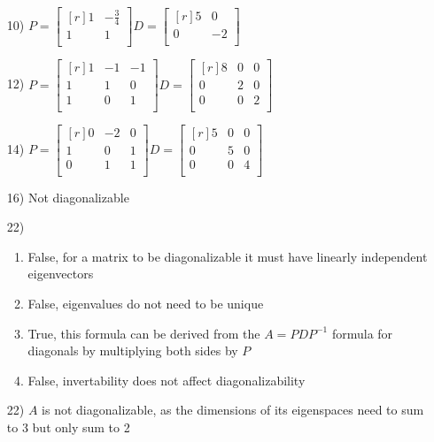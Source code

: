 \documentclass{article}
\begin{document}
\begin{enumerate}
  \item[10)]
    $P = \begin{bmatrix*}[r]
      1 & -\frac{3}{4} \\
      1 & 1 \\
    \end{bmatrix*} 
    D = \begin{bmatrix*}[r]
      5 & 0 \\
      0 & -2 \\
    \end{bmatrix*}$ 
  \item[12)]
    $P = \begin{bmatrix*}[r]
      1 & -1 & -1 \\ 
      1 & 1 & 0 \\ 
      1 & 0 & 1 \\
    \end{bmatrix*}
    D = \begin{bmatrix*}[r]
      8 & 0 & 0 \\
      0 & 2 & 0 \\
      0 & 0 & 2 \\
    \end{bmatrix*}$

  \item[14)]
    $P = \begin{bmatrix*}[r]
      0 & -2 & 0 \\
      1 & 0 & 1 \\
      0 & 1 & 1 \\
    \end{bmatrix*}
    D = \begin{bmatrix*}[r]
      5 & 0 & 0 \\
      0 & 5 & 0 \\
      0 & 0 & 4 \\
    \end{bmatrix*}$

  \item[16)]
    Not diagonalizable
  
  \item[22)]
    \begin{enumerate}
    \item
      False, for a matrix to be diagonalizable it must have 
      linearly independent eigenvectors
    \item 
      False, eigenvalues do not need to be unique

    \item
      True, this formula can be derived from the 
      $A = PDP^{-1}$ formula for diagonals by multiplying both
      sides by $P$
    \item 
      False, invertability does not affect diagonalizability
    \end{enumerate}

  \item[22)]
    $A$ is not diagonalizable, as the dimensions of its
    eigenspaces need to sum to 3 but only sum to 2
\end{enumerate}
\end{document}
